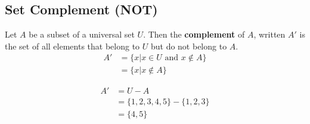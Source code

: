\documentclass[../notes.tex]{subfiles}
\begin{document}
      \subsection{Set Complement (NOT)}
        Let $A$ be a subset of a universal set $U$. Then the \textbf{complement} of $A$, written $A'$ is the set of all elements that belong to $U$ but do not belong to $A$.
        \begin{align*}
          A' & = \biggl\{x | x \in U \text{ and } x \notin A\biggr\}\\
          & = \biggl\{x | x \notin A\biggr\} 
        \end{align*}
        \begin{center}
        \end{center}
        \begin{examplebox}
          \begin{align*}
            A' &= U - A\\
            &= \{1, 2, 3, 4, 5\} - \{1, 2, 3\}\\
            &= \{4, 5\}
          \end{align*}
        \end{examplebox}
\end{document}
